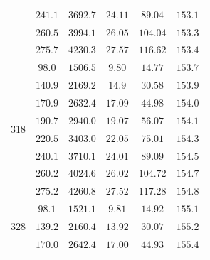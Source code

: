 \documentclass[a4paper,12pt]{article}
\begin{document}
\begin{tabular}{|c|c|c|c|c|c|}
                & $241.1$                 & $3692.7$                  & $24.11$        & $89.04$         & $153.1$                   \\\cline{2-6}
                & $260.5$                 & $3994.1$                  & $26.05$        & $104.04$        & $153.3$                   \\\cline{2-6}
                & $275.7$                 & $4230.3$                  & $27.57$        & $116.62$        & $153.4$                   \\\hline
  \multirow{8}{*}{318}
                & $98.0$                  & $1506.5$                  & $9.80$         & $14.77$         & $153.7$                   \\\cline{2-6}
                & $140.9$                 & $2169.2$                  & $14.9$         & $30.58$         & $153.9$                   \\\cline{2-6}
                & $170.9$                 & $2632.4$                  & $17.09$        & $44.98$         & $154.0$                   \\\cline{2-6}
                & $190.7$                 & $2940.0$                  & $19.07$        & $56.07$         & $154.1$                   \\\cline{2-6}
                & $220.5$                 & $3403.0$                  & $22.05$        & $75.01$         & $154.3$                   \\\cline{2-6}
                & $240.1$                 & $3710.1$                  & $24.01$        & $89.09$         & $154.5$                   \\\cline{2-6}
                & $260.2$                 & $4024.6$                  & $26.02$        & $104.72$        & $154.7$                   \\\cline{2-6}
                & $275.2$                 & $4260.8$                  & $27.52$        & $117.28$        & $154.8$                   \\\hline
  \multirow{8}{*}{328}
                & $98.1$                  & $1521.1$                  & $9.81$         & $14.92$         & $155.1$                   \\\cline{2-6}
                & $139.2$                 & $2160.4$                  & $13.92$        & $30.07$         & $155.2$                   \\\cline{2-6}
                & $170.0$                 & $2642.4$                  & $17.00$        & $44.93$         & $155.4$                   \\\cline{2-6}

\end{tabular}
\end{document}
